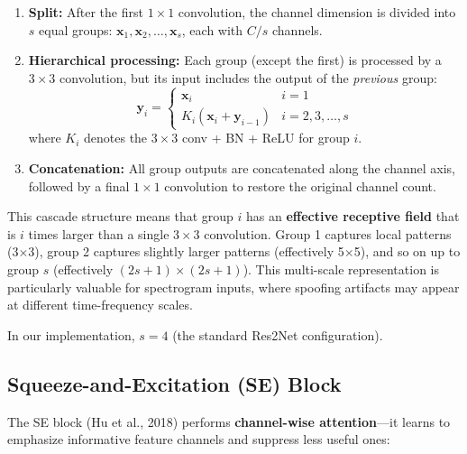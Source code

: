 \documentclass[12pt]{report}
\begin{document}
\begin{enumerate}
    \item \textbf{Split:} After the first $1 \times 1$ convolution, the channel dimension is
          divided into $s$ equal groups: $\bm{x}_1, \bm{x}_2, \ldots, \bm{x}_s$, each with
          $C/s$ channels.

    \item \textbf{Hierarchical processing:} Each group (except the first) is processed by
          a $3 \times 3$ convolution, but its input includes the output of the \emph{previous}
          group:
          \begin{equation}
              \bm{y}_i = \begin{cases}
                  \bm{x}_i & i = 1 \\
                  K_i(\bm{x}_i + \bm{y}_{i-1}) & i = 2, 3, \ldots, s
              \end{cases}
          \end{equation}
          where $K_i$ denotes the $3 \times 3$ conv + BN + ReLU for group $i$.

    \item \textbf{Concatenation:} All group outputs are concatenated along the channel axis,
          followed by a final $1 \times 1$ convolution to restore the original channel count.
\end{enumerate}

This cascade structure means that group $i$ has an \textbf{effective receptive field} that is
$i$ times larger than a single $3 \times 3$ convolution. Group 1 captures local patterns
(3$\times$3), group 2 captures slightly larger patterns (effectively 5$\times$5), and so on
up to group $s$ (effectively $(2s+1) \times (2s+1)$). This multi-scale representation is
particularly valuable for spectrogram inputs, where spoofing artifacts may appear at different
time-frequency scales.

In our implementation, $s = 4$ (the standard Res2Net configuration).

\subsection{Squeeze-and-Excitation (SE) Block}

The SE block (Hu et al., 2018) performs \textbf{channel-wise attention}---it learns to
emphasize informative feature channels and suppress less useful ones:
\end{document}
